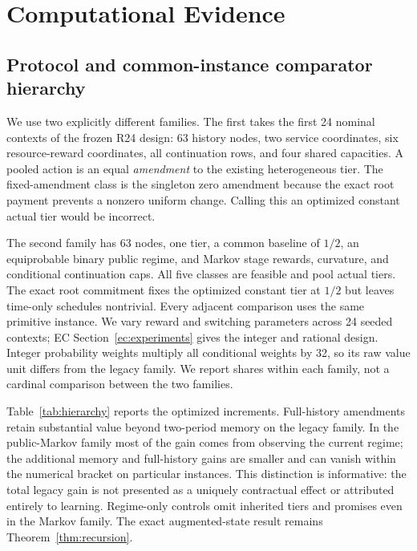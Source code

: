 \documentclass[11pt,letterpaper]{article}
\theoremstyle{definition}\newtheorem{assumption}[theorem]{Assumption}
\begin{document}
\section{Computational Evidence}\label{sec:evidence}
\subsection{Protocol and common-instance comparator hierarchy}
We use two explicitly different families. The first takes the first 24 nominal contexts of the frozen R24 design: 63 history nodes, two service coordinates, six resource-reward coordinates, all continuation rows, and four shared capacities. A pooled action is an equal \emph{amendment} to the existing heterogeneous tier. The fixed-amendment class is the singleton zero amendment because the exact root payment prevents a nonzero uniform change. Calling this an optimized constant actual tier would be incorrect.

The second family has 63 nodes, one tier, a common baseline of $1/2$, an equiprobable binary public regime, and Markov stage rewards, curvature, and conditional continuation caps. All five classes are feasible and pool actual tiers. The exact root commitment fixes the optimized constant tier at $1/2$ but leaves time-only schedules nontrivial. Every adjacent comparison uses the same primitive instance. We vary reward and switching parameters across 24 seeded contexts; EC Section~\ref{ec:experiments} gives the integer and rational design. Integer probability weights multiply all conditional weights by 32, so its raw value unit differs from the legacy family. We report shares within each family, not a cardinal comparison between the two families.

Table~\ref{tab:hierarchy} reports the optimized increments. Full-history amendments retain substantial value beyond two-period memory on the legacy family. In the public-Markov family most of the gain comes from observing the current regime; the additional memory and full-history gains are smaller and can vanish within the numerical bracket on particular instances. This distinction is informative: the total legacy gain is not presented as a uniquely contractual effect or attributed entirely to learning. Regime-only controls omit inherited tiers and promises even in the Markov family. The exact augmented-state result remains Theorem~\ref{thm:recursion}.


\end{document}
